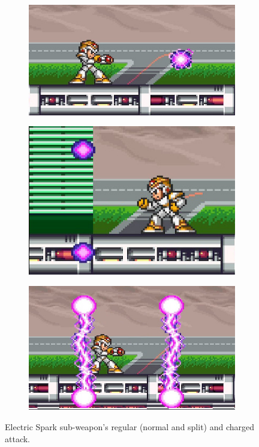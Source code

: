 \begin{figure}[htp]
	\centering
	\begin{subfigure}{0.35\linewidth}
		\includegraphics[width=\linewidth]{figures/X1/weapons/Electric_spark_1.jpg}
	\end{subfigure}
	\begin{subfigure}{0.25\linewidth}
		\includegraphics[width=\linewidth]{figures/X1/weapons/Electric_spark_2.jpg}
	\end{subfigure}
	\begin{subfigure}{0.3\linewidth}
		\includegraphics[width=\linewidth]{figures/X1/weapons/Electric_spark_3.jpg}
	\end{subfigure}
	\caption{Electric Spark sub-weapon's regular (normal and split) and charged attack.}
\end{figure}

